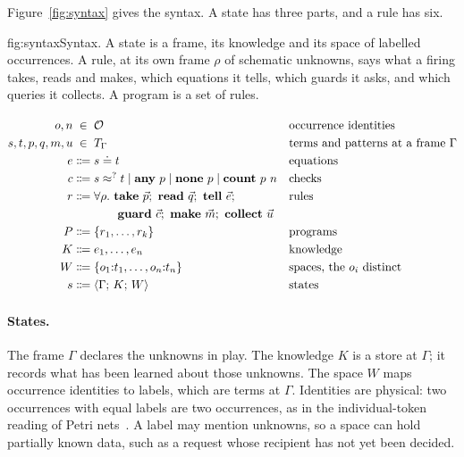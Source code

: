 \documentclass[11pt]{article}
\makeatletter
\theoremstyle{plain}
\theoremstyle{definition}
\theoremstyle{remark}
\newenvironment{grammar}
  {\begin{center}$\renewcommand{\arraystretch}{1.25}%
   \begin{array}{@{}r@{\;}c@{\;}l@{\quad}l@{}}}
  {\end{array}$\end{center}}
\newcommand{\gr}[3]{#1 & \Coloneqq & #2 & \text{#3}}
\newcommand{\grin}[3]{#1 & \in & #2 & \text{#3}}
\newcommand{\alt}{\mathrel{\mid}}
\newcommand{\st}[3]{\langle #1;\,#2;\,#3\rangle}
\newcommand{\occ}[2]{#1{:}#2}
\newcommand{\keq}{\doteq}
\newcommand{\kw}[1]{\mathbf{#1}}
\makeatother
\begin{document}
Figure~\ref{fig:syntax} gives the syntax. A state has three parts, and a rule has six.

\begin{rulefigure}[!htb]{fig:syntax}{Syntax. A state is a frame, its knowledge and its space of
labelled occurrences. A rule, at its own frame $\rho$ of schematic unknowns, says what a firing
takes, reads and makes, which equations it tells, which guards it asks, and which queries it
collects. A program is a set of rules.}
\begin{grammar}
  \grin{o,n}{\mathcal O}{occurrence identities} \\
  \grin{s,t,p,q,m,u}{T_\Gamma}{terms and patterns at a frame $\Gamma$} \\
  \gr{e}{s\keq t}{equations} \\
  \gr{c}{s\approx^{?}t \alt \kw{any}\ p \alt \kw{none}\ p \alt \kw{count}\ p\ n}{checks} \\
  \gr{r}{\forall\rho.\ \kw{take}\ \vec p;\ \kw{read}\ \vec q;\ \kw{tell}\ \vec e;}{rules} \\
  & & \qquad\kw{guard}\ \vec c;\ \kw{make}\ \vec m;\ \kw{collect}\ \vec u & \\
  \gr{P}{\{r_1,\dots,r_k\}}{programs} \\
  \gr{K}{e_1,\dots,e_n}{knowledge} \\
  \gr{W}{\{\occ{o_1}{t_1},\dots,\occ{o_n}{t_n}\}}{spaces, the $o_i$ distinct} \\
  \gr{s}{\st{\Gamma}{K}{W}}{states}
\end{grammar}
\end{rulefigure}

\paragraph{States.} The frame $\Gamma$ declares the unknowns in play. The knowledge $K$ is a
store at $\Gamma$; it records what has been learned about those unknowns. The space $W$ maps
occurrence identities to labels, which are terms at $\Gamma$. Identities are physical: two
occurrences with equal labels are two occurrences, as in the individual-token reading of Petri
nets~\cite{vanglabbeek-tokens}. A label may mention unknowns, so a space can hold partially
known data, such as a request whose recipient has not yet been decided.
\end{document}

